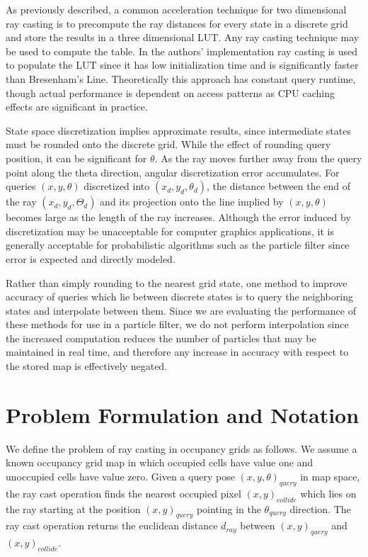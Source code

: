 \documentclass[letterpaper, 10 pt, conference]{ieeeconf}  %
\begin{document}
As previously described, a common acceleration technique for two dimensional ray casting is to precompute the ray distances for every state in a discrete grid and store the results in a three dimensional LUT. Any ray casting technique may be used to compute the table. In the authors’ implementation ray casting is used to populate the LUT since it has low initialization time and is significantly faster than Bresenham’s Line. Theoretically this approach has constant query runtime, though actual performance is dependent on access patterns as CPU caching effects are significant in practice.

State space discretization implies approximate results, since intermediate states must be rounded onto the discrete grid. While the effect of rounding query position, it can be significant for $\theta$. As the ray moves further away from the query point along the theta direction, angular discretization error accumulates. For queries $(x,y,\theta)$ discretized into $(x_d,y_d,\theta_d)$, the distance between the end of the ray $(x_d,y_d,Θ_d)$ and its projection onto the line implied by $(x,y,\theta)$ becomes large as the length of the ray increases. Although the error induced by discretization may be unacceptable for computer graphics applications, it is generally acceptable for probabilistic algorithms such as the particle filter since error is expected and directly modeled. 

Rather than simply rounding to the nearest grid state, one method to improve accuracy of queries which lie between discrete states is to query the neighboring states and interpolate between them. Since we are evaluating the performance of these methods for use in a particle filter, we do not perform interpolation since the increased computation reduces the number of particles that may be maintained in real time, and therefore any increase in accuracy with respect to the stored map is effectively negated.

\section{Problem Formulation and Notation}

We define the problem of ray casting in occupancy grids as follows. We assume a known occupancy grid map in which occupied cells have value one and unoccupied cells have value zero. Given a query pose $(x,y,\theta)_{query}$ in map space, the ray cast operation finds the nearest occupied pixel $(x,y)_{collide}$ which lies on the ray starting at the position $(x,y)_{query}$ pointing in the $\theta_{query}$ direction. The ray cast operation returns the euclidean distance $d_{ray}$ between $(x,y)_{query}$ and $(x,y)_{collide}$.
\end{document}

